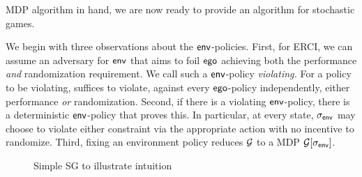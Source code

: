 
MDP algorithm in hand, we are now ready to provide an algorithm for
stochastic games.


 We begin with three observations about
the $\mathsf{env}$-policies.  First, for ERCI, we can assume an adversary for $\mathsf{env}$ 
that aims to foil $\mathsf{ego}$ achieving both the performance \emph{and}
randomization requirement. We call such a $\mathsf{env}$-policy \emph{violating.} For a policy to be violating,  suffices to violate, against every $\mathsf{ego}$-policy independently, either
performance \emph{or} randomization.  Second, if there is a violating
$\mathsf{env}$-policy, there is a deterministic $\mathsf{env}$-policy that proves
this.  In particular, at every state, ${\sigma_{\mathsf{env}}}$ may choose to
violate either constraint via the appropriate action with no incentive
to randomize. Third, fixing an environment policy reduces $\mathcal{G}$ to a
MDP $\mathcal{G}[{\sigma_{\mathsf{env}}}]$.

\begin{figure}[t]
\centering
\scalebox{0.8}{

}
\caption{Simple SG to illustrate intuition}
\label{fig:sg:simplest}
\end{figure}

